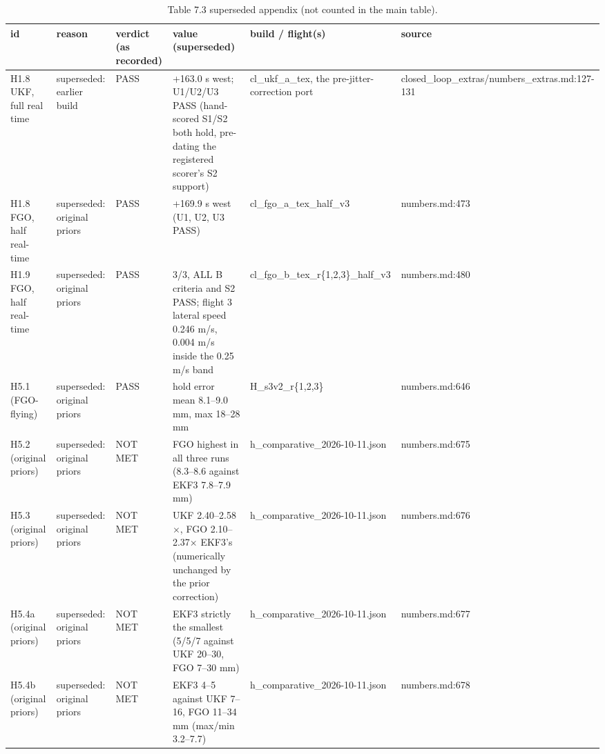 \begin{table}[htbp]
\centering
\scriptsize
\caption{Table 7.3 superseded appendix (not counted in the main table).}
\label{tab:7-3}
\begin{tabular}{p{}p{}p{}p{}p{}p{}}
\toprule
id & reason & verdict (as recorded) & value (superseded) & build / flight(s) & source \\
\midrule
H1.8 UKF, full real time & superseded: earlier build & PASS & +163.0 s west; U1/U2/U3 PASS (hand-scored S1/S2 both hold, pre-dating the registered scorer's S2 support) & cl\_ukf\_a\_tex, the pre-jitter-correction port & closed\_loop\_extras/numbers\_extras.md:127-131 \\
H1.8 FGO, half real-time & superseded: original priors & PASS & +169.9 s west (U1, U2, U3 PASS) & cl\_fgo\_a\_tex\_half\_v3 & numbers.md:473 \\
H1.9 FGO, half real-time & superseded: original priors & PASS & 3/3, ALL B criteria and S2 PASS; flight 3 lateral speed 0.246 m/s, 0.004 m/s inside the 0.25 m/s band & cl\_fgo\_b\_tex\_r\{1,2,3\}\_half\_v3 & numbers.md:480 \\
H5.1 (FGO-flying) & superseded: original priors & PASS & hold error mean 8.1--9.0 mm, max 18--28 mm & H\_s3v2\_r\{1,2,3\} & numbers.md:646 \\
H5.2 (original priors) & superseded: original priors & NOT MET & FGO highest in all three runs (8.3--8.6 against EKF3 7.8--7.9 mm) & h\_comparative\_2026-10-11.json & numbers.md:675 \\
H5.3 (original priors) & superseded: original priors & NOT MET & UKF 2.40--2.58$\times$, FGO 2.10--2.37$\times$ EKF3's (numerically unchanged by the prior correction) & h\_comparative\_2026-10-11.json & numbers.md:676 \\
H5.4a (original priors) & superseded: original priors & NOT MET & EKF3 strictly the smallest (5/5/7 against UKF 20--30, FGO 7--30 mm) & h\_comparative\_2026-10-11.json & numbers.md:677 \\
H5.4b (original priors) & superseded: original priors & NOT MET & EKF3 4--5 against UKF 7--16, FGO 11--34 mm (max/min 3.2--7.7) & h\_comparative\_2026-10-11.json & numbers.md:678 \\

\end{tabular}
\end{table}
